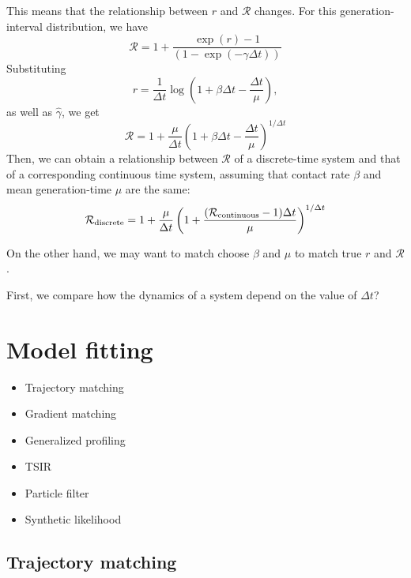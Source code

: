 \documentclass{article}
\begin{document}
This means that the relationship between $r$ and $\mathcal R$ changes.
For this generation-interval distribution, we have
\begin{equation}
\mathcal R = 1 + \frac{\exp(r) -1}{(1-\exp(-\gamma \Delta t)) }
\end{equation}
Substituting 
\begin{equation}
r = \frac{1}{\Delta t} \log \left(1 + \beta \Delta t - \frac{\Delta t}{\mu}\right),
\end{equation}
as well as $\hat \gamma$, we get
\begin{equation}
\mathcal R = 1 + \frac{\mu}{\Delta t} \left(1 + \beta \Delta t - \frac{\Delta t}{\mu}\right)^{1/\Delta t}
\end{equation}
Then, we can obtain a relationship between $\mathcal R$ of a discrete-time system and that of a corresponding continuous time system, assuming that contact rate $\beta$ and mean generation-time $\mu$ are the same:
\begin{equation}
\mathcal R_{\tiny \textrm{discrete}} = 1 + \frac{\mu}{\Delta t} \left(1 + \frac{(\mathcal R_{\tiny \textrm{continuous}}  - 1) \Delta t }{\mu}\right)^{1/\Delta t}
\end{equation}

On the other hand, we may want to match choose $\beta$ and $\mu$ to match true $r$ and $\mathcal R$.




First, we compare how the dynamics of a system depend on the value of $\Delta t$?



\section{Model fitting}

\begin{itemize}
	\item Trajectory matching
	\item Gradient matching
	\item Generalized profiling
	\item TSIR
	\item Particle filter
	\item Synthetic likelihood
\end{itemize}

\subsection{Trajectory matching}
\end{document}
